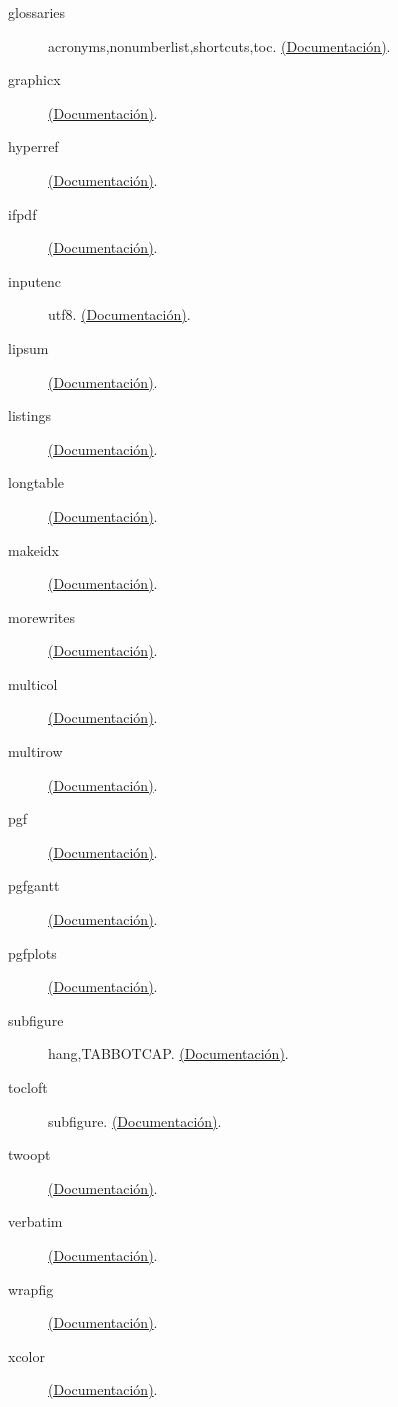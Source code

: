 \begin{description}
\item [glossaries] acronyms,nonumberlist,shortcuts,toc. \href{http://osl.ugr.es/CTAN/macros/latex/contrib/glossaries/glossaries-user.pdf}{(Documentación)}.
\item [graphicx] \href{http://osl.ugr.es/CTAN/macros/latex/required/graphics/grfguide.pdf}{(Documentación)}.
\item [hyperref] \href{http://osl.ugr.es/CTAN/macros/latex/contrib/hyperref/doc/manual.pdf}{(Documentación)}.
\item [ifpdf] \href{http://osl.ugr.es/CTAN/macros/latex/contrib/oberdiek/ifpdf.pdf}{(Documentación)}.
\item [inputenc] utf8. \href{http://osl.ugr.es/CTAN/macros/latex/base/inputenc.pdf}{(Documentación)}.
\item [lipsum] \href{http://osl.ugr.es/CTAN/macros/latex/contrib/lipsum/lipsum.pdf}{(Documentación)}.
\item [listings] \href{http://osl.ugr.es/CTAN/macros/latex/contrib/listings/listings.pdf}{(Documentación)}.
\item [longtable] \href{http://osl.ugr.es/CTAN/macros/latex/required/tools/longtable.pdf}{(Documentación)}.
\item [makeidx] \href{http://osl.ugr.es/CTAN/macros/latex/base/makeindx.pdf}{(Documentación)}.
\item [morewrites] \href{http://osl.ugr.es/CTAN/macros/latex/contrib/morewrites/morewrites.pdf}{(Documentación)}.
\item [multicol] \href{http://osl.ugr.es/CTAN/macros/latex/required/tools/multicol.pdf}{(Documentación)}.
\item [multirow] \href{http://osl.ugr.es/CTAN/macros/latex/contrib/multirow/multirow.pdf}{(Documentación)}.
\item [pgf] \href{http://osl.ugr.es/CTAN/graphics/pgf/base/doc/pgfmanual.pdf}{(Documentación)}.
\item [pgfgantt] \href{http://osl.ugr.es/CTAN/graphics/pgf/contrib/pgfgantt/pgfgantt.pdf}{(Documentación)}.
\item [pgfplots] \href{http://osl.ugr.es/CTAN/graphics/pgf/contrib/pgfplots/doc/pgfplots.pdf}{(Documentación)}.
\item [subfigure] hang,TABBOTCAP. \href{http://osl.ugr.es/CTAN/obsolete/macros/latex/contrib/subfigure/subfigure.pdf}{(Documentación)}.
\item [tocloft] subfigure. \href{http://osl.ugr.es/CTAN/macros/latex/contrib/tocloft/tocloft.pdf}{(Documentación)}.
\item [twoopt] \href{http://osl.ugr.es/CTAN/macros/latex/contrib/oberdiek/twoopt.pdf}{(Documentación)}.
\item [verbatim] \href{http://osl.ugr.es/CTAN/macros/latex/required/tools/verbatim.pdf}{(Documentación)}.
\item [wrapfig] \href{http://osl.ugr.es/CTAN/macros/latex/contrib/wrapfig/wrapfig-doc.pdf}{(Documentación)}.
\item [xcolor] \href{http://osl.ugr.es/CTAN/macros/latex/contrib/xcolor/xcolor.pdf}{(Documentación)}.
\end{description}
